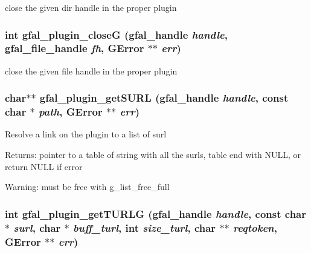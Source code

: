 close the given dir handle in the proper plugin 
\subsubsection{\setlength{\rightskip}{0pt plus 5cm}int gfal\_\-plugin\_\-close\-G (gfal\_\-handle {\em handle}, gfal\_\-file\_\-handle {\em fh}, GError $\ast$$\ast$ {\em err})}\label{gfal__common__plugin_8h_13d1db9798e5a830c745e2f909a484f4}


close the given file handle in the proper plugin 
\subsubsection{\setlength{\rightskip}{0pt plus 5cm}char$\ast$$\ast$ gfal\_\-plugin\_\-get\-SURL (gfal\_\-handle {\em handle}, const char $\ast$ {\em path}, GError $\ast$$\ast$ {\em err})}\label{gfal__common__plugin_8h_79e889a6f6f6297772952d69cdfceff7}


Resolve a link on the plugin to a list of surl \begin{Desc}
\item[Returns:]pointer to a table of string with all the surls, table end with NULL, or return NULL if error \end{Desc}
\begin{Desc}
\item[Warning:]must be free with g\_\-list\_\-free\_\-full \end{Desc}
\subsubsection{\setlength{\rightskip}{0pt plus 5cm}int gfal\_\-plugin\_\-get\-TURLG (gfal\_\-handle {\em handle}, const char $\ast$ {\em surl}, char $\ast$ {\em buff\_\-turl}, int {\em size\_\-turl}, char $\ast$$\ast$ {\em reqtoken}, GError $\ast$$\ast$ {\em err})}\label{gfal__common__plugin_8h_acf838514b0862d12fbfeab576959c1e}


